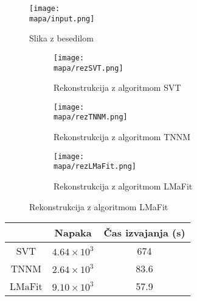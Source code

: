 \renewcommand{\mapa}{Poglavja/Slike/besedilo}

\begin{figure}[!ht]
    \centering
    \texttt{[image: \\mapa/input.png]}
    \caption{Slika z besedilom}
\end{figure}

\begin{figure}[!ht]
    \begin{subfigure}{0.325\linewidth}
        \texttt{[image: \\mapa/rezSVT.png]}
        \caption{Rekonstrukcija z algoritmom SVT}
    \end{subfigure}
    \hfill
    \begin{subfigure}{0.325\linewidth}
        \texttt{[image: \\mapa/rezTNNM.png]}
        \caption{Rekonstrukcija z algoritmom TNNM}
    \end{subfigure}
    \hfill
    \begin{subfigure}{0.325\linewidth}
        \texttt{[image: \\mapa/rezLMaFit.png]}
        \caption{Rekonstrukcija z algoritmom LMaFit}
    \end{subfigure}
\end{figure}

\begin{table}[!ht]
    \centering
    \begin{tabular}{|c|c|c|}
    \hline
    & Napaka & Čas izvajanja (s) \\
    \hline
    SVT & $4.64 \times 10^{3}$ & 674 \\
    TNNM & $2.64 \times 10^{3}$ & 83.6 \\
    LMaFit & $9.10 \times 10^{3}$ & 57.9 \\
    \hline
    \end{tabular}
\end{table}